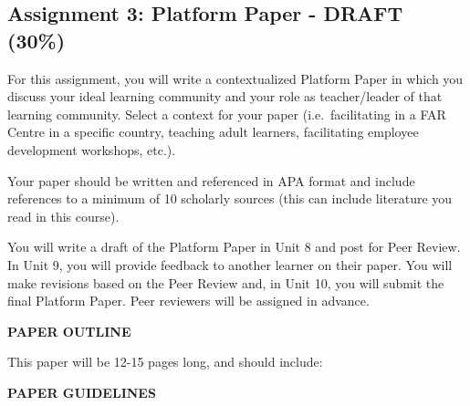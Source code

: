 \documentclass[
]{book}
\providecommand{\tightlist}{%
  \setlength{\itemsep}{0pt}\setlength{\parskip}{0pt}}
\begin{document}
\begin{assessment}
\hypertarget{assignment-3-platform-paper---draft-30}{%
\subsection*{Assignment 3: Platform Paper - DRAFT
(30\%)}\label{assignment-3-platform-paper---draft-30}}

For this assignment, you will write a contextualized Platform Paper in
which you discuss your ideal learning community and your role as
teacher/leader of that learning community. Select a context for your
paper (i.e.~facilitating in a FAR Centre in a specific country, teaching
adult learners, facilitating employee development workshops, etc.).

Your paper should be written and referenced in APA format and include
references to a minimum of 10 scholarly sources (this can include
literature you read in this course).

You will write a draft of the Platform Paper in Unit 8 and post for Peer
Review. In Unit 9, you will provide feedback to another learner on their
paper. You will make revisions based on the Peer Review and, in Unit 10,
you will submit the final Platform Paper. Peer reviewers will be
assigned in advance.

\textbf{PAPER OUTLINE}

This paper will be 12-15 pages long, and should include:


\textbf{PAPER GUIDELINES}


\end{assessment}
\end{document}
